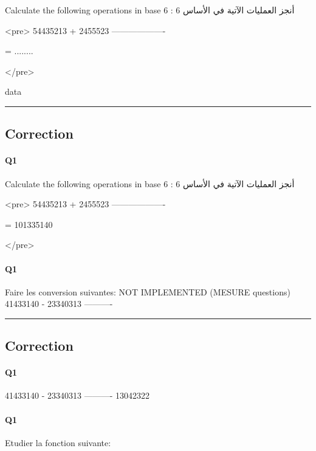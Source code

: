 Calculate  the following operations in base 6 :  أنجز العمليات الآتية في الأساس 6

<pre>
  54435213
+ 2455523
-------------------

=  ........

</pre>

data


\hrule width 1\linewidth
\pagebreak

\subsection{Correction}


\paragraph{Q1}

Calculate  the following operations in base 6 :  أنجز العمليات الآتية في الأساس 6

<pre>
  54435213
+ 2455523
-------------------

=  101335140

</pre>

\pagebreak

\paragraph{Q1}

Faire les conversion suivantes: NOT IMPLEMENTED (MESURE questions) 
  41433140
- 23340313
----------




\hrule width 1\linewidth
\pagebreak

\subsection{Correction}


\paragraph{Q1}

  41433140
- 23340313
----------
  13042322

\pagebreak

\paragraph{Q1}



Etudier la fonction suivante:



